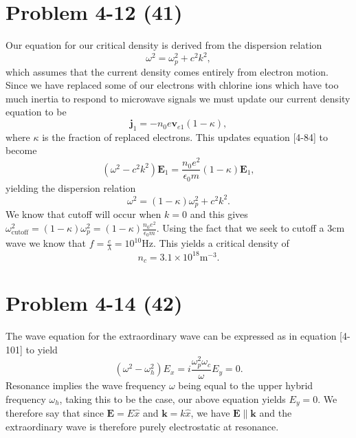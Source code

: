 \section*{Problem 4-12 (41)}
\label{sec:4-12}
Our equation for our critical density is derived from the dispersion relation
\begin{equation*}
	\omega^2 = \omega_p^2 + c^2k^2,
\end{equation*}
which assumes that the current density comes entirely from electron motion. Since we have replaced some of our electrons with chlorine ions which have too much inertia to respond to microwave signals we must update our current density equation to be
\begin{equation*}
	\bm{j}_1 = -n_0e\bm{v}_{e1}(1-\kappa),
\end{equation*}
where \(\kappa \) is the fraction of replaced electrons. This updates equation [4-84] to become 
\begin{equation*}
	\left(\omega^2 - c^2k^2 \right)\bm{E}_1 = \dfrac{n_0e^2}{\epsilon_0m}\left(1-\kappa\right)\bm{E}_1,
\end{equation*}
yielding the dispersion relation
\begin{equation*}
	\omega^2 = (1-\kappa)\omega^2_p + c^2k^2.
\end{equation*}
We know that cutoff will occur when \(k=0\) and this gives \(\omega^2_\text{cutoff} = (1-\kappa)\omega^2_p = (1-\kappa)\frac{n_0e^2}{\epsilon_0m} \). Using the fact that we seek to cutoff a \(3\)cm wave we know that \(f = \frac{c}{\lambda} = 10^{10} \)Hz. This yields a critical density of
\begin{equation*}
	n_c = 3.1\times 10^{18}\text{m}^{-3}. %
\end{equation*}


\section*{Problem 4-14 (42)}
\label{sec:4-14}
The wave equation for the extraordinary wave can be expressed as in equation [4-101] to yield
\begin{equation*}
	(\omega^2 - \omega^2_h)E_x = i\dfrac{\omega^2_p\omega_c}{\omega}E_y = 0.
\end{equation*}
Resonance implies the wave frequency \(\omega \) being equal to the upper hybrid frequency \(\omega_h \), taking this to be the case, our above equation yields \(E_y = 0 \). We therefore say that since \(\bm{E} = E\hat{x}\) and \(\bm{k} = k\hat{x} \), we have \(\bm{E}\parallel\bm{k} \) and the extraordinary wave is therefore purely electrostatic at resonance.


